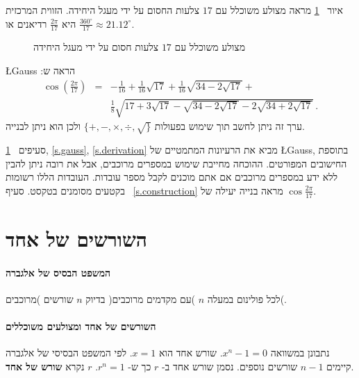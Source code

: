 \documentclass[11pt,a4paper]{article}
\newenvironment{form}[1]{%
\begin{displaymath}%
\renewcommand{\arraystretch}{#1}%
\begin{array}{lcl}}%
{\end{array}%
\end{displaymath}%
}
\newcommand*{\disfrac}[2]{\displaystyle\frac{#1}{#2}}
\newcommand*{\sm}[1]{$\scriptstyle #1$}
\begin{document}
איור%
~\ref{fig.hept}
מראה מצולע משוכלל עם 
$17$
צלעות
החסום על ידי מעגל היחידה.
הזווית המרכזית היא
$\disfrac{2\pi}{17}$
רדיאנים או
$\disfrac{360^\circ}{17}\approx 21.12^\circ$. 
\begin{figure}
\begin{center}
\caption{מצולע משוכלל עם $17$ צלעות חסום על ידי מעגל היחידה}\label{fig.hept}
\end{center}
\end{figure}
\L{Gauss}
הראה ש:
\begin{form}{3}
\cos\left(\disfrac{2\pi}{17}\right) &=& 
-\disfrac{1}{16}+\disfrac{1}{16}\sqrt{17} + 
     \disfrac{1}{16}\sqrt{34-2\sqrt{17}}
    + \\
    &&
     \disfrac{1}{8}\sqrt{
     17+3\sqrt{17} - 
     \sqrt{34-2\sqrt{17}}
   -2
     \sqrt{34+2\sqrt{17}}
   }\,.
\end{form}
ערך זה ניתן לחשב תוך שימוש בפעולות
$\{+,-,\times,\div,\surd\}$
ולכן הוא ניתן לבנייה. 

סעיפים%
~\ref{s.roots}, \ref{s.gauss}, \ref{s.derivation}
מביא את הרעיונות המתמטיים של
\L{Gauss},
בתוספת החישובים המפורטים.
ההוכחה מחייבת שימוש במספרים מרוכבים, אבל את רובה ניתן להבין ללא ידע במספרים מרוכבים אם אתם מוכנים לקבל מספר עובדות. העובדות הללו רשומות בקטעים מסומנים בטקסט.
סעיף%
~\ref{s.construction}
מראה בנייה יעילה של
$\cos\disfrac{2\pi}{17}$.


\section{השורשים של אחד}\label{s.roots}

\paragraph{המשפט הבסיס של אלגברה}
לכל פולינום במעלה 
$n$
)עם מקדמים מרוכבים(
בדיוק
$n$
שורשים
)מרוכבים(.

\paragraph{%
השורשים של אחד ומצולעים משוכללים%
}
נתבונן במשוואה
$x^{n}-1=0$.
שורש אחד הוא
$x=1$.
לפי המשפט הבסיסי של אלגברה קיימים
$n-1$
שורשים נוספים. נסמן שורש אחד ב-%
$r$
כך ש-%
$r^{n}=1$.
$r$
נקרא
\textbf{שורש של אחד}.
\end{document}
